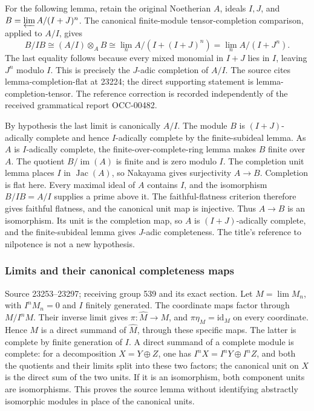 For the following lemma, retain the original Noetherian \(A\), ideals \(I,J\), and \(B=\varprojlim A/(I+J)^n\). The canonical finite-module tensor-completion comparison, applied to \(A/I\), gives \[
B/IB
 \cong (A/I)\otimes_A B
 \cong \lim_n A/(I+(I+J)^n)
 =\lim_n A/(I+J^n).
\] The last equality follows because every mixed monomial in \(I+J\) lies in \(I\), leaving \(J^n\) modulo \(I\). This is precisely the \(J\)-adic completion of \(A/I\). The source cites lemma-\AlgebraIdentifierBreak{}completion-\AlgebraIdentifierBreak{}flat at 23224; the direct supporting statement is lemma-\AlgebraIdentifierBreak{}completion-\AlgebraIdentifierBreak{}tensor. The reference correction is recorded independently of the received grammatical report OCC-00482.

By hypothesis the last limit is canonically \(A/I\). The module \(B\) is \((I+J)\)-adically complete and hence \(I\)-adically complete by the finite-subideal lemma. As \(A\) is \(I\)-adically complete, the finite-over-complete-ring lemma makes \(B\) finite over \(A\). The quotient \(B/\operatorname{im}(A)\) is finite and is zero modulo \(I\). The completion unit lemma places \(I\) in \(\operatorname{Jac}(A)\), so Nakayama gives surjectivity \(A\to B\). Completion is flat here. Every maximal ideal of \(A\) contains \(I\), and the isomorphism \(B/IB=A/I\) supplies a prime above it. The faithful-flatness criterion therefore gives faithful flatness, and the canonical unit map is injective. Thus \(A\to B\) is an isomorphism. Its unit is the completion map, so \(A\) is \((I+J)\)-adically complete, and the finite-subideal lemma gives \(J\)-adic completeness. The title's reference to nilpotence is not a new hypothesis.

\subsubsection{Limits and their canonical completeness maps}\label{algebra-proof-015-limits-and-their-canonical-completeness-maps}

Source 23253--23297; receiving group 539 and its exact section. Let \(M=\lim M_n\), with \(I^nM_n=0\) and \(I\) finitely generated. The coordinate maps factor through \(M/I^nM\). Their inverse limit gives \(\pi:\widehat M\to M\), and \(\pi\eta_M=\mathrm{id}_M\) on every coordinate. Hence \(M\) is a direct summand of \(\widehat M\), through these specific maps. The latter is complete by finite generation of \(I\). A direct summand of a complete module is complete: for a decomposition \(X=Y\oplus Z\), one has \(I^nX=I^nY\oplus I^nZ\), and both the quotients and their limits split into these two factors; the canonical unit on \(X\) is the direct sum of the two units. If it is an isomorphism, both component units are isomorphisms. This proves the source lemma without identifying abstractly isomorphic modules in place of the canonical units.

